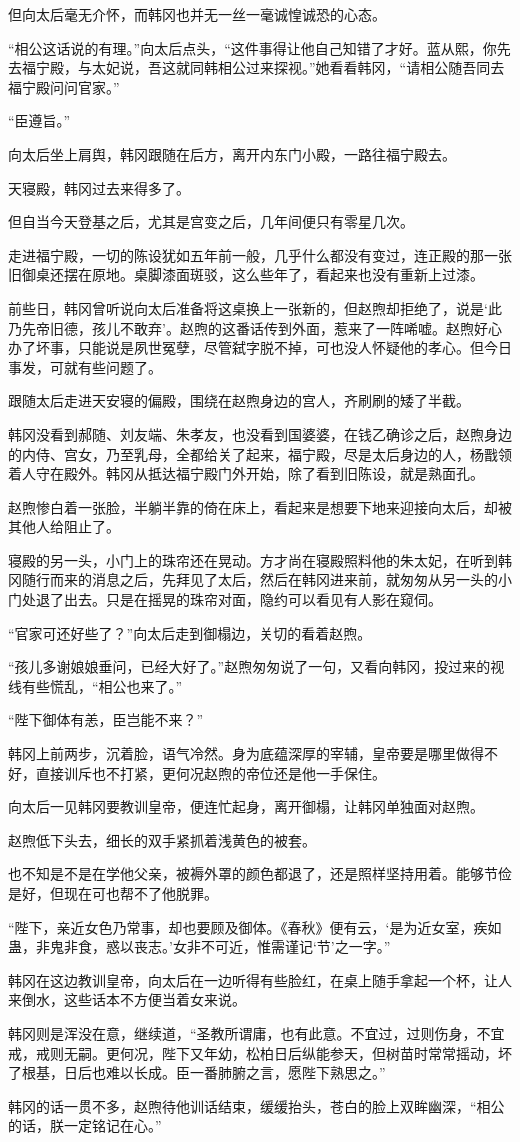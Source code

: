 但向太后毫无介怀，而韩冈也并无一丝一毫诚惶诚恐的心态。

“相公这话说的有理。”向太后点头，“这件事得让他自己知错了才好。蓝从熙，你先去福宁殿，与太妃说，吾这就同韩相公过来探视。”她看看韩冈，“请相公随吾同去福宁殿问问官家。”

“臣遵旨。”

向太后坐上肩舆，韩冈跟随在后方，离开内东门小殿，一路往福宁殿去。

天寝殿，韩冈过去来得多了。

但自当今天登基之后，尤其是宫变之后，几年间便只有零星几次。

走进福宁殿，一切的陈设犹如五年前一般，几乎什么都没有变过，连正殿的那一张旧御桌还摆在原地。桌脚漆面斑驳，这么些年了，看起来也没有重新上过漆。

前些日，韩冈曾听说向太后准备将这桌换上一张新的，但赵煦却拒绝了，说是‘此乃先帝旧德，孩儿不敢弃’。赵煦的这番话传到外面，惹来了一阵唏嘘。赵煦好心办了坏事，只能说是夙世冤孽，尽管弑字脱不掉，可也没人怀疑他的孝心。但今日事发，可就有些问题了。

跟随太后走进天安寝的偏殿，围绕在赵煦身边的宫人，齐刷刷的矮了半截。

韩冈没看到郝随、刘友端、朱孝友，也没看到国婆婆，在钱乙确诊之后，赵煦身边的内侍、宫女，乃至乳母，全都给关了起来，福宁殿，尽是太后身边的人，杨戬领着人守在殿外。韩冈从抵达福宁殿门外开始，除了看到旧陈设，就是熟面孔。

赵煦惨白着一张脸，半躺半靠的倚在床上，看起来是想要下地来迎接向太后，却被其他人给阻止了。

寝殿的另一头，小门上的珠帘还在晃动。方才尚在寝殿照料他的朱太妃，在听到韩冈随行而来的消息之后，先拜见了太后，然后在韩冈进来前，就匆匆从另一头的小门处退了出去。只是在摇晃的珠帘对面，隐约可以看见有人影在窥伺。

“官家可还好些了？”向太后走到御榻边，关切的看着赵煦。

“孩儿多谢娘娘垂问，已经大好了。”赵煦匆匆说了一句，又看向韩冈，投过来的视线有些慌乱，“相公也来了。”

“陛下御体有恙，臣岂能不来？”

韩冈上前两步，沉着脸，语气冷然。身为底蕴深厚的宰辅，皇帝要是哪里做得不好，直接训斥也不打紧，更何况赵煦的帝位还是他一手保住。

向太后一见韩冈要教训皇帝，便连忙起身，离开御榻，让韩冈单独面对赵煦。

赵煦低下头去，细长的双手紧抓着浅黄色的被套。

也不知是不是在学他父亲，被褥外罩的颜色都退了，还是照样坚持用着。能够节俭是好，但现在可也帮不了他脱罪。

“陛下，亲近女色乃常事，却也要顾及御体。《春秋》便有云，‘是为近女室，疾如蛊，非鬼非食，惑以丧志。’女非不可近，惟需谨记‘节’之一字。”

韩冈在这边教训皇帝，向太后在一边听得有些脸红，在桌上随手拿起一个杯，让人来倒水，这些话本不方便当着女来说。

韩冈则是浑没在意，继续道，“圣教所谓庸，也有此意。不宜过，过则伤身，不宜戒，戒则无嗣。更何况，陛下又年幼，松柏日后纵能参天，但树苗时常常摇动，坏了根基，日后也难以长成。臣一番肺腑之言，愿陛下熟思之。”

韩冈的话一贯不多，赵煦待他训话结束，缓缓抬头，苍白的脸上双眸幽深，“相公的话，朕一定铭记在心。”
